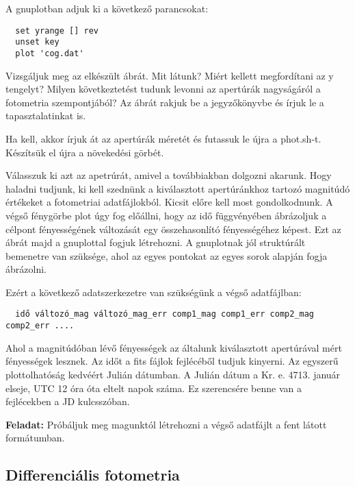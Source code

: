 \documentclass{article}
\begin{document}
A gnuplotban adjuk ki a következő parancsokat:
\begin{verbatim}
  set yrange [] rev
  unset key
  plot 'cog.dat'
\end{verbatim}

Vizsgáljuk meg az elkészült ábrát. Mit látunk? Miért kellett megfordítani az y
tengelyt? Milyen következtetést tudunk levonni az apertúrák nagyságáról a
fotometria szempontjából? Az ábrát rakjuk be a jegyzőkönyvbe és írjuk le a
tapasztalatinkat is.

Ha kell, akkor írjuk át az apertúrák méretét és futassuk le újra a phot.sh-t.
Készítsük el újra a növekedési görbét.

Válasszuk ki azt az apetrúrát, amivel a továbbiakban dolgozni akarunk.
Hogy haladni tudjunk, ki kell szednünk a kiválasztott apertúránkhoz tartozó
magnitúdó értékeket a fotometriai adatfájlokból.
Kicsit előre kell most gondolkodnunk. A végső fénygörbe plot úgy fog előállni,
hogy az idő függvényében ábrázoljuk a célpont fényességének változását egy
összehasonlító fényességéhez képest. Ezt az ábrát majd a gnuplottal fogjuk
létrehozni. A gnuplotnak jól struktúrált bemenetre van szüksége, ahol az egyes
pontokat az egyes sorok alapján fogja ábrázolni.

Ezért a következő adatszerkezetre van szükségünk a végső adatfájlban:
\begin{verbatim}
  idő változó_mag változó_mag_err comp1_mag comp1_err comp2_mag comp2_err ....
\end{verbatim}

Ahol a magnitúdóban lévő fényességek az általunk kiválasztott apertúrával mért
fényességek lesznek.
Az időt a fits fájlok fejlécéből tudjuk kinyerni. Az egyszerű plottolhatóság
kedvéért Julián dátumban. A Julián dátum a Kr. e. 4713. január elseje, UTC 12
óra óta eltelt napok száma. Ez szerencsére benne van a fejlécekben a JD
kulcsszóban.

{\bf Feladat:}
Próbáljuk meg magunktól létrehozni a végső adatfájlt a fent látott formátumban.

\subsection{Differenciális fotometria}

\end{document}
